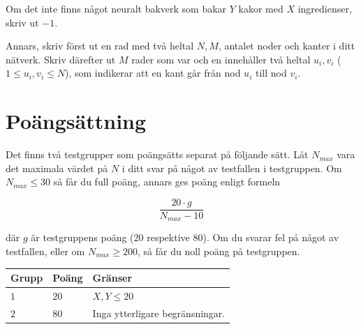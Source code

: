 Om det inte finns något neuralt bakverk som bakar $Y$ kakor med $X$ ingredienser, skriv 
ut $-1$.

Annars, skriv först ut en rad med två heltal $N,M$, antalet noder och kanter i ditt nätverk. 
Skriv därefter ut $M$ rader som var och en innehåller två heltal $u_i, v_i$ ($1 \leq u_i, v_i \leq N$),
som indikerar att en kant går från nod $u_i$ till nod $v_i$.

\section*{Poängsättning}
Det finns två testgrupper som poängsätts separat på följande sätt. Låt $N_{max}$ vara det maximala 
värdet på $N$ i ditt svar på något av testfallen i testgruppen. Om $N_{max} \leq 30$ så får du 
full poäng, annars ges poäng enligt formeln

$$ \frac{20 \cdot g}{N_{max} - 10} $$

där $g$ är testgruppens poäng ($20$ respektive $80$). Om du svarar fel på något av testfallen, eller om 
$N_{max} \geq 200$, så får du noll poäng på testgruppen.

\noindent
\begin{tabular}{| l | l | p{12cm} |}
  \hline
  \textbf{Grupp} & \textbf{Poäng} & \textbf{Gränser} \\ \hline
  $1$    & $20$        & $X,Y \leq 20$ \\ \hline
  $2$    & $80$        & Inga ytterligare begränsningar. \\ \hline
\end{tabular}


